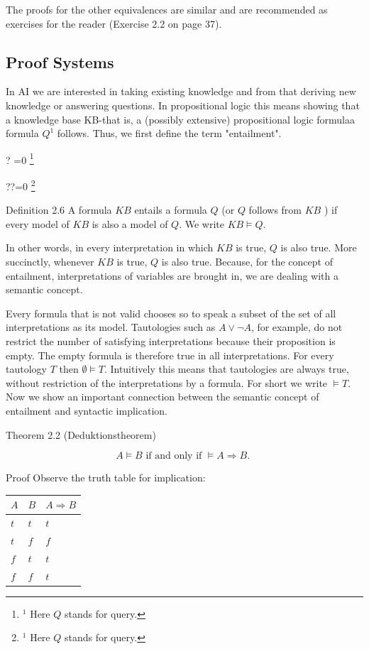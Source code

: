 \documentclass[10pt]{book}
\let\svthefootnote\thefootnote
\newcommand\blfootnotetext[1]{%
  \let\thefootnote\relax\footnote{#1}%
  \addtocounter{footnote}{-1}%
  \let\thefootnote\svthefootnote%
}
\let\svfootnotetext\footnotetext
\renewcommand\footnotetext[2][?]{%
  \if\relax#1\relax%
    \ifnum\value{footnote}=0\blfootnotetext{#2}\else\svfootnotetext{#2}\fi%
  \else%
    \if?#1\ifnum\value{footnote}=0\blfootnotetext{#2}\else\svfootnotetext{#2}\fi%
    \else\svfootnotetext[#1]{#2}\fi%
  \fi
}
\begin{document}
The proofs for the other equivalences are similar and are recommended as exercises for the reader (Exercise 2.2 on page 37).

\subsection{Proof Systems}
In AI we are interested in taking existing knowledge and from that deriving new knowledge or answering questions. In propositional logic this means showing that a knowledge base KB-that is, a (possibly extensive) propositional logic formulaa formula $Q^{1}$ follows. Thus, we first define the term "entailment".

Definition 2.6 A formula $K B$ entails a formula $Q$ (or $Q$ follows from $K B$ ) if every model of $K B$ is also a model of $Q$. We write $K B \models Q$.

In other words, in every interpretation in which $K B$ is true, $Q$ is also true. More succinctly, whenever $K B$ is true, $Q$ is also true. Because, for the concept of entailment, interpretations of variables are brought in, we are dealing with a semantic concept.

Every formula that is not valid chooses so to speak a subset of the set of all interpretations as its model. Tautologies such as $A \vee \neg A$, for example, do not restrict the number of satisfying interpretations because their proposition is empty. The empty formula is therefore true in all interpretations. For every tautology $T$ then $\emptyset \models T$. Intuitively this means that tautologies are always true, without restriction of the interpretations by a formula. For short we write $\models T$. Now we show an important connection between the semantic concept of entailment and syntactic implication.

Theorem 2.2 (Deduktionstheorem)

$$
A \models B \text { if and only if } \models A \Rightarrow B \text {. }
$$

Proof Observe the truth table for implication:

\begin{center}
\begin{tabular}{lll}
\hline
$A$ & $B$ & $A \Rightarrow B$ \\
\hline
$t$ & $t$ & $t$ \\
\hline
$t$ & $f$ & $f$ \\
\hline
$f$ & $t$ & $t$ \\
\hline
$f$ & $f$ & $t$ \\
\hline
\end{tabular}
\end{center}
\end{document}
